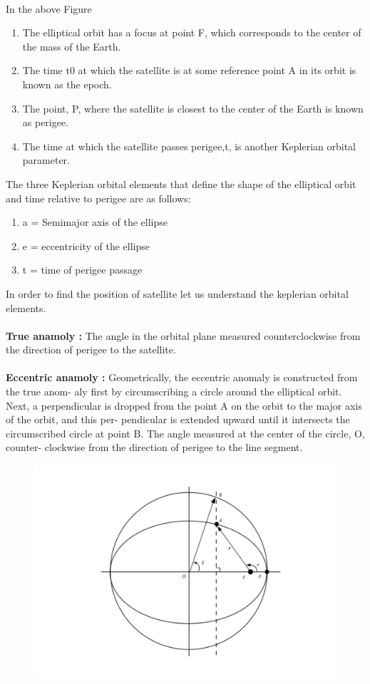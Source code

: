 \documentclass[10pt]{book}
\begin{document}
\vspace{30cm}
\\
In the above Figure 
\begin{enumerate}
\item The elliptical orbit has a focus at point
F, which corresponds to the center of the mass of the Earth.
\item The time t0 at which the satellite is at some
reference point A in its orbit is known as the epoch.
\item The point, P, where the satellite is closest to the center of the Earth
is known as perigee.
\item The time at which the satellite passes perigee,t, is another
Keplerian orbital parameter.
\end{enumerate}
\vspace{5mm}
The three Keplerian orbital elements
that define the shape of the elliptical orbit and time relative to perigee are as
follows:
\begin{enumerate}
  \item a = Semimajor axis of the ellipse
  \item e = eccentricity of the ellipse
  \item t = time of perigee passage
\end{enumerate}
In order to find the position of satellite let us understand the keplerian orbital elements.\\
\\
\textbf{True anamoly :} The angle in the orbital plane measured counterclockwise from
the direction of perigee to the satellite.\\ 
\\
\textbf{Eccentric anamoly :} Geometrically, the eccentric anomaly is constructed from the true anom-
aly first by circumscribing a circle around the elliptical orbit. Next, a perpendicular
is dropped from the point A on the orbit to the major axis of the orbit, and this per-
pendicular is extended upward until it intersects the circumscribed circle at point B. The angle measured at the center of the circle, O, counter-
clockwise from the direction of perigee to the line segment.
\begin{figure}
  \includegraphics[scale=0.4]{./figs/2.pdf}
  \end{figure}
\end{document}
